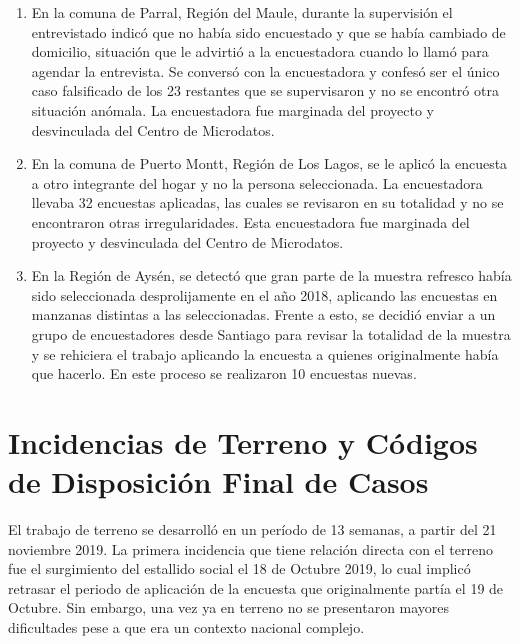 \documentclass[
]{book}
\begin{document}
\begin{enumerate}
  \begin{enumerate}
  \def\labelenumii{\roman{enumii}.}
  \item
    En la comuna de Parral, Región del Maule, durante la supervisión el entrevistado indicó que no había sido encuestado y que se había cambiado de domicilio, situación que le advirtió a la encuestadora cuando lo llamó para agendar la entrevista. Se conversó con la encuestadora y confesó ser el único caso falsificado de los 23 restantes que se supervisaron y no se encontró otra situación anómala. La encuestadora fue marginada del proyecto y desvinculada del Centro de Microdatos.
  \item
    En la comuna de Puerto Montt, Región de Los Lagos, se le aplicó la encuesta a otro integrante del hogar y no la persona seleccionada. La encuestadora llevaba 32 encuestas aplicadas, las cuales se revisaron en su totalidad y no se encontraron otras irregularidades. Esta encuestadora fue marginada del proyecto y desvinculada del Centro de Microdatos.
  \item
    En la Región de Aysén, se detectó que gran parte de la muestra refresco había sido seleccionada desprolijamente en el año 2018, aplicando las encuestas en manzanas distintas a las seleccionadas. Frente a esto, se decidió enviar a un grupo de encuestadores desde Santiago para revisar la totalidad de la muestra y se rehiciera el trabajo aplicando la encuesta a quienes originalmente había que hacerlo. En este proceso se realizaron 10 encuestas nuevas.
  \end{enumerate}
\end{enumerate}

\hypertarget{incidencias-de-terreno-y-cuxf3digos-de-disposiciuxf3n-final-de-casos}{%
\section{Incidencias de Terreno y Códigos de Disposición Final de Casos}\label{incidencias-de-terreno-y-cuxf3digos-de-disposiciuxf3n-final-de-casos}}

El trabajo de terreno se desarrolló en un período de 13 semanas, a partir del 21 noviembre 2019. La primera incidencia que tiene relación directa con el terreno fue el surgimiento del estallido social el 18 de Octubre 2019, lo cual implicó retrasar el periodo de aplicación de la encuesta que originalmente partía el 19 de Octubre. Sin embargo, una vez ya en terreno no se presentaron mayores dificultades pese a que era un contexto nacional complejo.
\end{document}
